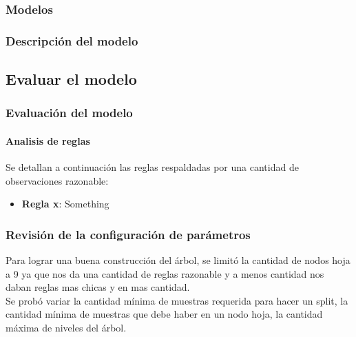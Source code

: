     \newpage
    \subsubsection{Modelos}

        \def\RUN{1}
        \def\title{Resultados de la corrida 1 del arbol de decisión J48}
        \def\algorithm{weka}
        \def\numberOfRules{17}
        \def\hasRules{1}
        
        \newpage

        \def\RUN{2}
        \def\title{Resultados de la corrida 2 del arbol de decisión J48}
        \def\algorithm{weka}
        \def\numberOfRules{20}
        \def\hasRules{1}
        
        \newpage

        \def\RUN{1}
        \def\title{Resultados de la corrida de Perceptron}
        \def\algorithm{perceptron}
        \def\numberOfRules{20}
        \def\hasRules{0}
        

    \subsubsection{Descripción del modelo}
\subsection{Evaluar el modelo}
    \subsubsection{Evaluación del modelo}
        \paragraph{Analisis de reglas}

            Se detallan a continuación las reglas respaldadas por una cantidad
            de observaciones razonable:
            \begin{itemize}
                \item \textbf{Regla x}:
                    Something
            \end{itemize}

    \subsubsection{Revisión de la configuración de parámetros}
        Para lograr una buena construcción del árbol, se limitó la cantidad de
        nodos hoja a 9 ya que nos da una cantidad de reglas razonable y a menos
        cantidad nos daban reglas mas chicas y en mas cantidad.\\
        Se probó variar la cantidad mínima de muestras requerida para hacer
        un split, la cantidad mínima de muestras que debe haber en un nodo
        hoja, la cantidad máxima de niveles del árbol.

